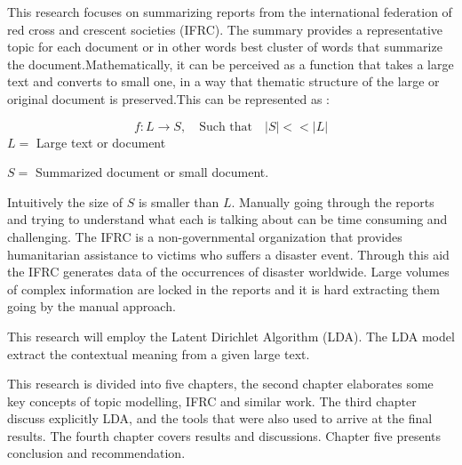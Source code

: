 This research focuses on summarizing reports from the international federation of red cross and crescent societies (IFRC). The summary provides  a  representative topic for each document or in other words best cluster of words that summarize the document.Mathematically, it can be perceived as a function that takes a large text and converts to small one, in a way that thematic structure of the large or original document is preserved.This can be represented as :

$$f:L \longrightarrow S, \quad \text{Such that} \quad |S|<< |L|$$
$L=$ Large text or document

 $S=$ Summarized document or small document.
  
Intuitively the size of $S$ is smaller than $L$.
Manually going through the reports and trying to understand what each is talking about can be time consuming and challenging. The IFRC is a non-governmental organization
that provides humanitarian assistance to victims who suffers a disaster event. Through this aid the 	IFRC generates data of the occurrences of disaster worldwide. Large volumes of complex information    are locked in the reports and it is hard extracting them going by the manual approach. 

This research will employ the Latent Dirichlet Algorithm (LDA).
 The LDA model extract the contextual meaning from a given large text. 

This research is divided into five chapters, the second chapter elaborates some key concepts of topic modelling, IFRC and similar work. The third chapter discuss explicitly LDA,  and the tools that were also used to arrive at the final results. The fourth chapter covers results and discussions. Chapter five presents conclusion and recommendation.

  
